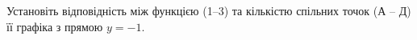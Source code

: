 \documentclass[12pt]{article}
\begin{document}
\begin{samepage}
\noindent\zadnum Установіть відповідність між функцією (1–3) та кількістю спільних точок (А – Д) її графіка з прямою $y=-1$. 

\nmtnobreak
\nopagebreak\nbvspace{0.3cm}

\nmtnobreak
{}
\par{}\vspace{0.25cm}
\end{samepage}
\end{document}
